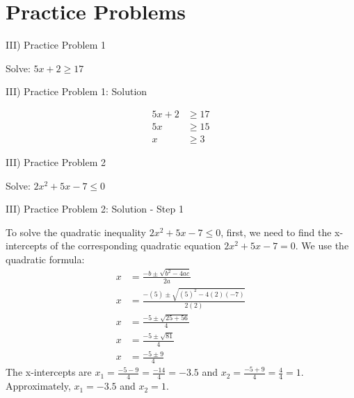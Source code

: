 \documentclass[aspectratio=169]{beamer}
\begin{document}
\section{Practice Problems}

\begin{frame}{III) Practice Problem 1}
    \begin{tcolorbox}[colback=lightgray,colframe=primary,title=Problem]
        \footnotesize
        Solve: $5x+2 \geq 17$
    \end{tcolorbox}
\end{frame}

\begin{frame}{III) Practice Problem 1: Solution}
    \begin{tcolorbox}[colback=lightgray,colframe=accent,title=Solution]
        \footnotesize
        \begin{align*}
            5x+2 &\geq 17\\
            5x &\geq 15\\
            x &\geq 3
        \end{align*}
    \end{tcolorbox}
\end{frame}

\begin{frame}{III) Practice Problem 2}
    \begin{tcolorbox}[colback=lightgray,colframe=primary,title=Problem]
        \footnotesize
        Solve: $2x^2+5x-7 \leq 0$
    \end{tcolorbox}
\end{frame}

\begin{frame}{III) Practice Problem 2: Solution - Step 1}
    \begin{tcolorbox}[colback=lightgray,colframe=accent,title=Solution: Step 1 - Find X-intercepts]
        \footnotesize
        To solve the quadratic inequality $2x^2+5x-7 \leq 0$, first, we need to find the x-intercepts of the corresponding quadratic equation $2x^2+5x-7=0$. We use the quadratic formula:
        \begin{align*}
            x &= \frac{-b \pm \sqrt{b^2-4ac}}{2a}\\[0.5em]
            x &= \frac{-(5) \pm \sqrt{(5)^2 - 4(2)(-7)}}{2(2)}\\[0.5em]
            x &= \frac{-5 \pm \sqrt{25 + 56}}{4}\\[0.5em]
            x &= \frac{-5 \pm \sqrt{81}}{4}\\[0.5em]
            x &= \frac{-5 \pm 9}{4}
        \end{align*}
        The x-intercepts are $x_1 = \frac{-5 - 9}{4} = \frac{-14}{4} = -3.5$ and $x_2 = \frac{-5 + 9}{4} = \frac{4}{4} = 1$.
        \newline
        Approximately, $x_1 = -3.5$ and $x_2 = 1$.
    \end{tcolorbox}
\end{frame}
\end{document}
